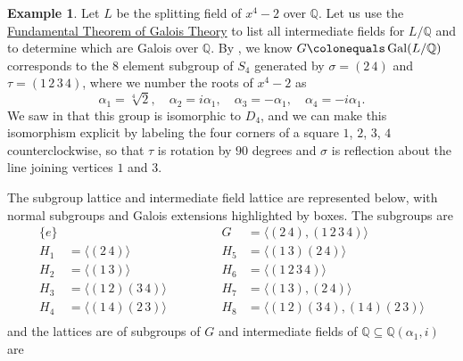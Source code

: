 \documentclass[12pt]{report}
\numberwithin{equation}{section}
\numberwithin{theorem}{chapter}
\theoremstyle{definition}
\newtheorem{example}[theorem]{Example}
\newtheorem*{basic properties}{Basic Properties}
\newtheorem*{Important Remark}{Important Remark}
\DeclareMathOperator{\Gal}{Gal}
\begin{document}
\begin{example}
Let $L$ be the splitting field of $x^4 - 2$ over $\mathbb{Q}$. Let us use the \hyperref[Fundamental Theorem of Galois Theory]{Fundamental Theorem of Galois Theory} to list all intermediate fields for $L/\mathbb{Q}$ and to determine which are Galois over $\mathbb{Q}$.
By , we know $G \colonequals \Gal(L/\mathbb{Q})$ corresponds to the $8$ element subgroup of $S_4$ generated by $\sigma = (2 \, 4)$ and $\tau = (1 \, 2 \,  3 \, 4)$, where we number the roots of $x^4-2$ as 
$$\alpha_1 = \sqrt[4]{2}, \quad \alpha_2 = i \alpha_1, \quad \alpha_3 = -\alpha_1, \quad \alpha_4 = -i \alpha_1.$$
We saw in  that this group is isomorphic to $D_4$, and we can make this isomorphism explicit by labeling the four corners of a square $1$, $2$, $3$, $4$ counterclockwise, so that $\tau$ is rotation by $90$ degrees and $\sigma$ is reflection about the line joining vertices $1$ and $3$.

The subgroup lattice and intermediate field lattice are represented below, with normal subgroups and Galois extensions highlighted by boxes.
The subgroups are
$$\begin{aligned}
\{e\} && \qquad &&  G &= \langle (2 \, 4), (1 \, 2 \, 3 \,4) \rangle \\
H_1 &= \langle (2 \, 4) \rangle & \qquad && H_5 &= \langle (1 \,3)(2 \, 4)  \rangle \\
H_2 &= \langle (1 \, 3)  \rangle & \qquad && H_6 & = \langle (1 \, 2 \, 3 \,4) \rangle \\
H_3 &= \langle (1 \, 2)(3 \, 4)  \rangle & \qquad && H_7 &= \langle  (1 \, 3), (2 \, 4)  \rangle \\
H_4 & = \langle (1 \,4)(2 \, 3)  \rangle & \qquad && H_8 &= \langle (1 \, 2)(3 \, 4), (1 \,4)(2 \, 3)  \rangle \\
\end{aligned}$$
and the lattices are of subgroups of $G$ and intermediate fields of $\mathbb{Q} \subseteq \mathbb{Q}(\alpha_1, i)$ are

\vspace{0.5em}


\end{example}
\end{document}
